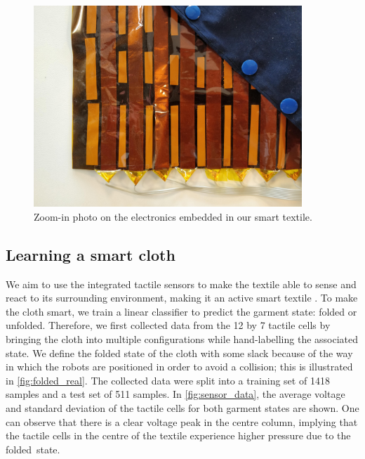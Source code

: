 \documentclass[\home/main.tex]{subfiles}
\begin{document}
\begin{figure}[htpb]
    \centering
    \includegraphics[width=0.90\textwidth, keepaspectratio]{figures/img-electronics-smart-textile.jpg}
    \caption{Zoom-in photo on the electronics embedded in our  smart textile.}
    \label{fig:textile_real_electronics}
\end{figure}



\subsection{Learning a smart cloth}
We aim to use the integrated tactile sensors to make the textile able to sense and react to its surrounding environment, making it an active smart textile \autocite{Stoppa2014}. To make the cloth smart, we train a linear classifier to predict the garment state: folded or unfolded. Therefore, we first collected data from the 12 by 7 tactile cells by bringing the cloth into multiple configurations while hand-labelling the associated state. We define the folded state of the cloth with some slack because of the way in which the robots are positioned in order to avoid a collision; this is illustrated in \cref{fig:folded_real}. The collected data were split into a training set of \qty{1418}{} samples and a test set of 511 samples. In \cref{fig:sensor_data}, the average voltage and standard deviation of the tactile cells for both garment states are shown. One can observe that there is a clear voltage peak in the centre column, implying that the tactile cells in the centre of the textile experience higher pressure due to the folded~state.
\end{document}

